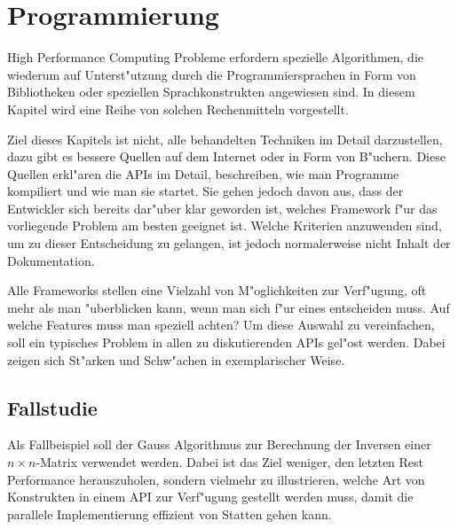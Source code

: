 \chapter{Programmierung}
High Performance Computing Probleme erfordern spezielle Algorithmen, die
wiederum auf Unterst"utzung durch die Programmiersprachen in Form von
Bibliotheken oder speziellen Sprachkonstrukten angewiesen sind.
In diesem Kapitel wird eine Reihe von solchen Rechenmitteln vorgestellt.

Ziel dieses Kapitels ist nicht, alle behandelten Techniken im Detail
darzustellen, dazu gibt es bessere Quellen auf dem Internet oder in
Form von B"uchern.
Diese Quellen erkl"aren die APIs im Detail, beschreiben, wie man Programme
kompiliert und wie man sie startet. Sie gehen jedoch davon aus, dass der
Entwickler sich bereits dar"uber klar geworden ist, welches Framework
f"ur das vorliegende Problem am besten geeignet ist.
Welche Kriterien anzuwenden sind, um zu dieser Entscheidung zu gelangen,
ist jedoch normalerweise nicht Inhalt der Dokumentation.

Alle Frameworks stellen eine Vielzahl von M"oglichkeiten zur
Verf"ugung, oft mehr als man "uberblicken kann, wenn man sich f"ur
eines entscheiden muss.
Auf welche Features muss man speziell achten? Um diese Auswahl
zu vereinfachen, soll ein typisches Problem in allen zu diskutierenden
APIs gel"ost werden. Dabei zeigen sich St"arken und Schw"achen  in
exemplarischer Weise.

\section{Fallstudie}
Als Fallbeispiel soll der Gauss Algorithmus zur Berechnung der Inversen
einer $n\times n$-Matrix verwendet werden. Dabei ist das Ziel weniger,
den letzten Rest Performance herauszuholen, sondern vielmehr zu
illustrieren, welche Art von Konstrukten in einem API zur Verf"ugung
gestellt werden muss, damit die parallele Implementierung effizient
von Statten gehen kann.

